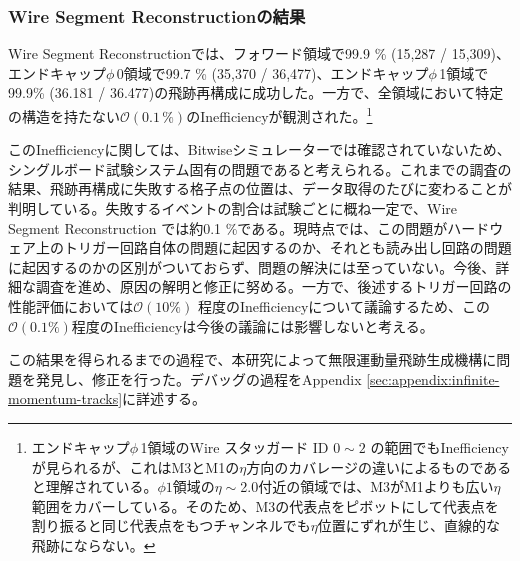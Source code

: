 \subsubsection*{Wire Segment Reconstructionの結果}
Wire Segment Reconstructionでは、フォワード領域で99.9 \% (15,287 / 15,309)、エンドキャップ$\phi\,$0領域で99.7 \% (35,370 / 36,477)、エンドキャップ$\phi\,$1領域で99.9\% (36.181 / 36.477)の飛跡再構成に成功した。一方で、全領域において特定の構造を持たない$\mathcal{O}(0.1\,\%)$のInefficiencyが観測された。\footnote{エンドキャップ$\phi\,$1領域のWire スタッガード ID $0 \sim 2$ の範囲でもInefficiencyが見られるが、これはM3とM1の$\eta$方向のカバレージの違いによるものであると理解されている。$\phi1$領域の$\eta\sim$2.0付近の領域では、M3がM1よりも広い$\eta$範囲をカバーしている。そのため、M3の代表点をピボットにして代表点を割り振ると同じ代表点をもつチャンネルでも$\eta$位置にずれが生じ、直線的な飛跡にならない。
}

このInefficiencyに関しては、Bitwiseシミュレーターでは確認されていないため、シングルボード試験システム固有の問題であると考えられる。これまでの調査の結果、飛跡再構成に失敗する格子点の位置は、データ取得のたびに変わることが判明している。失敗するイベントの割合は試験ごとに概ね一定で、Wire Segment Reconstruction では約0.1 \%である。現時点では、この問題がハードウェア上のトリガー回路自体の問題に起因するのか、それとも読み出し回路の問題に起因するのかの区別がついておらず、問題の解決には至っていない。今後、詳細な調査を進め、原因の解明と修正に努める。一方で、後述するトリガー回路の性能評価においては$\mathcal{O}(10 \%)$ 程度のInefficiencyについて議論するため、この$\mathcal{O}(0.1 \%)$程度のInefficiencyは今後の議論には影響しないと考える。

この結果を得られるまでの過程で、本研究によって無限運動量飛跡生成機構に問題を発見し、修正を行った。デバッグの過程をAppendix \ref{sec:appendix:infinite-momentum-tracks}に詳述する。

